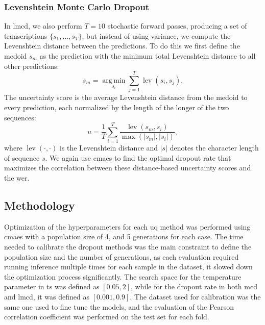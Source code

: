 \documentclass[11pt]{article}
\begin{document}
\subsubsection{Levenshtein Monte Carlo Dropout}
In \acrshort{lmcd}, we also perform $T = 10$ stochastic forward passes, producing a set of transcriptions $\{s_1, \dots, s_T\}$, but instead of using variance, we compute the Levenshtein distance \cite{levenshtein1966binary} between the predictions. To do this we first define the medoid $s_m$ as the prediction with the minimum total Levenshtein distance to all other predictions:
\begin{equation}
    s_m = \operatorname*{arg\,min}_{s_i}\sum_{j=1}^{T} \operatorname{lev}(s_i, s_j).
\end{equation}
The uncertainty score is the average Levenshtein\cite{levenshtein1966binary} distance from the medoid to every prediction, each normalized by the length of the longer of the two sequences:
\begin{equation}
    u = \frac{1}{T}\sum_{i=1}^{T} \frac{\operatorname{lev}(s_m, s_i)}{\max\left(|s_m|, |s_i|\right)},
\end{equation}
where $\operatorname{lev}(\cdot, \cdot)$ is the Levenshtein distance and $|s|$ denotes the character length of sequence $s$.
We again use \acrshort{cmaes} to find the optimal dropout rate that maximizes the correlation between these distance-based uncertainty scores and the \acrshort{wer}.

\subsection{Methodology}

Optimization of the hyperparameters for each \acrshort{uq} method was performed using \acrshort{cmaes} with a population size of 4, and 5 generations for each case. The time needed to calibrate the dropout methods was the main constraint to define the population size and the number of generations, as each evaluation required running inference multiple times for each sample in the dataset, it slowed down the optimization process significantly.
The search space for the temperature parameter in \acrshort{ts} was defined as $[0.05, 2]$, while for the dropout rate in both \acrshort{mcd} and \acrshort{lmcd}, it was defined as $[0.001, 0.9]$.
The dataset used for calibration was the same one used to fine tune the models, and the evaluation of the Pearson correlation coefficient was performed on the test set for each fold.
\end{document}
